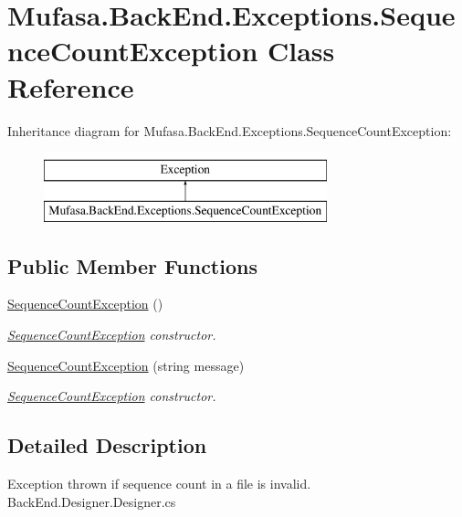 \hypertarget{class_mufasa_1_1_back_end_1_1_exceptions_1_1_sequence_count_exception}{\section{Mufasa.\+Back\+End.\+Exceptions.\+Sequence\+Count\+Exception Class Reference}
\label{class_mufasa_1_1_back_end_1_1_exceptions_1_1_sequence_count_exception}
}
Inheritance diagram for Mufasa.\+Back\+End.\+Exceptions.\+Sequence\+Count\+Exception\+:\begin{figure}[H]
\begin{center}
\leavevmode
\includegraphics[height=2.000000cm]{class_mufasa_1_1_back_end_1_1_exceptions_1_1_sequence_count_exception}
\end{center}
\end{figure}
\subsection*{Public Member Functions}
\begin{DoxyCompactItemize}
\item 
\hyperlink{class_mufasa_1_1_back_end_1_1_exceptions_1_1_sequence_count_exception_a7145b5fb8b3ab93b145e583bcc813c32}{Sequence\+Count\+Exception} ()
\begin{DoxyCompactList}\small\item\em \hyperlink{class_mufasa_1_1_back_end_1_1_exceptions_1_1_sequence_count_exception}{Sequence\+Count\+Exception} constructor. \end{DoxyCompactList}\item 
\hyperlink{class_mufasa_1_1_back_end_1_1_exceptions_1_1_sequence_count_exception_a4a24df40384bb9e496adba815496bb80}{Sequence\+Count\+Exception} (string message)
\begin{DoxyCompactList}\small\item\em \hyperlink{class_mufasa_1_1_back_end_1_1_exceptions_1_1_sequence_count_exception}{Sequence\+Count\+Exception} constructor. \end{DoxyCompactList}\end{DoxyCompactItemize}


\subsection{Detailed Description}
Exception thrown if sequence count in a file is invalid. Back\+End.\+Designer.\+Designer.\+cs 

